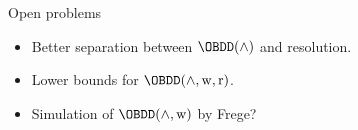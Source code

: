 \begin{frame}{Open problems}

    \begin{itemize}
        \item Better separation between $\OBDD(\land)$ and resolution.
        \item Lower bounds for $\OBDD(\land, \weakening, \reordering)$.
        \item Simulation of $\OBDD(\land, \weakening)$ by Frege?
    \end{itemize}
    
\end{frame}
